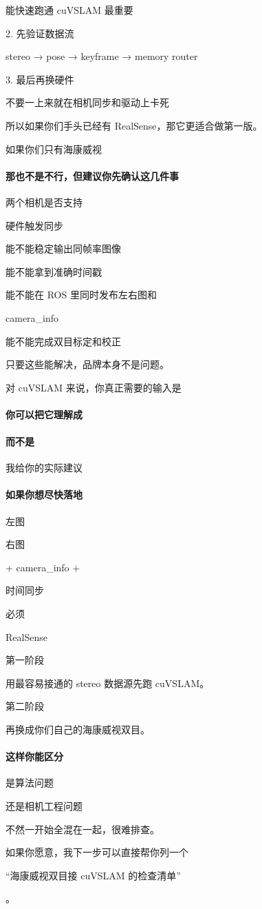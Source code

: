\documentclass[12pt]{article}
\begin{document}
能快速跑通 cuVSLAM 最重要

2. 先验证数据流

stereo → pose → keyframe → memory router

3. 最后再换硬件

不要一上来就在相机同步和驱动上卡死

所以如果你们手头已经有 RealSense，那它更适合做第一版。

如果你们只有海康威视

\paragraph{那也不是不行，但建议你先确认这几件事}
两个相机是否支持

硬件触发同步

能不能稳定输出同帧率图像

能不能拿到准确时间戳

能不能在 ROS 里同时发布左右图和

camera\_info

能不能完成双目标定和校正

只要这些能解决，品牌本身不是问题。

对 cuVSLAM 来说，你真正需要的输入是

\paragraph{你可以把它理解成}
\paragraph{而不是}
我给你的实际建议

\paragraph{如果你想尽快落地}
左图

右图

+ camera\_info +

时间同步

必须

RealSense

第一阶段

用最容易接通的 stereo 数据源先跑 cuVSLAM。

第二阶段

再换成你们自己的海康威视双目。

\paragraph{这样你能区分}
是算法问题

还是相机工程问题

不然一开始全混在一起，很难排查。

如果你愿意，我下一步可以直接帮你列一个

“海康威视双目接 cuVSLAM 的检查清单”

。
\end{document}
